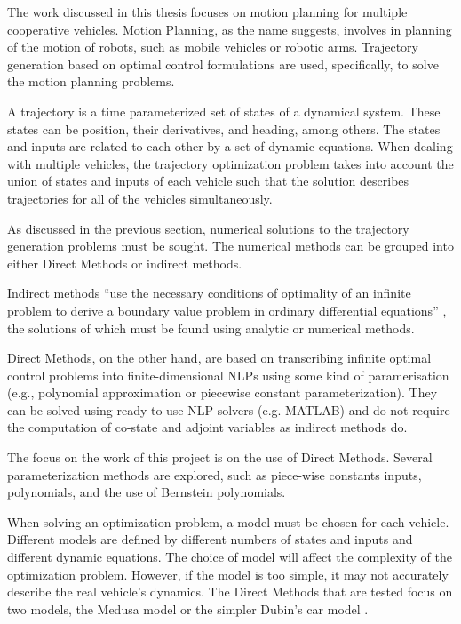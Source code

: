 \par The work discussed in this thesis focuses on motion planning for multiple cooperative vehicles. Motion Planning, as the name suggests, involves in planning of the motion of robots, such as mobile vehicles or robotic arms. Trajectory generation based on optimal control formulations are used, specifically, to solve the motion planning problems. 
\par A trajectory is a time parameterized set of states of a dynamical system. These states can be position, their derivatives, and heading, among others. The states and inputs are related to each other by a set of dynamic equations. When dealing with multiple vehicles, the trajectory optimization problem takes into account the union of states and inputs of each vehicle such that the solution describes trajectories for all of the vehicles simultaneously.
\par As discussed in the previous section, numerical solutions to the trajectory generation problems must be sought. The numerical methods can be grouped into either Direct Methods or indirect methods. 
\par Indirect methods “use the necessary conditions of optimality of an infinite problem to derive a boundary value problem in ordinary differential equations” \cite{diehl2006fast}, the solutions of which must be found using analytic or numerical methods. 
\par Direct Methods, on the other hand, are based on transcribing infinite optimal control problems into finite-dimensional \acp{NLP} using some kind of paramerisation (e.g., polynomial approximation or piecewise constant parameterization). They can be solved using ready-to-use NLP solvers (e.g. MATLAB) and do not require the computation of co-state and adjoint variables as indirect methods do.
\par The focus on the work of this project is on the use of Direct Methods. Several parameterization methods are explored, such as piece-wise constants inputs, polynomials, and the use of Bernstein polynomials.
\par When solving an optimization problem, a model must be chosen for each vehicle. 
Different models are defined by different numbers of states and inputs and different dynamic equations. The choice of model will affect the complexity of the optimization problem. However, if the model is too simple, it may not accurately describe the real vehicle's dynamics. The Direct Methods that are tested focus on two models, the Medusa model \cite{abreu2016medusa} or the simpler Dubin's car model \cite{Reeds1990OPTIMALPF}.


